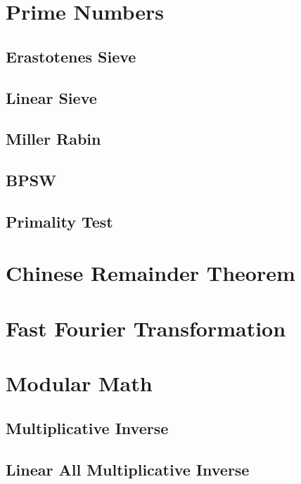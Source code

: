 \documentclass[10pt,a4paper]{report}
\begin{document}
	\section{Prime Numbers}
		\subsection{Erastotenes Sieve}
		\subsection{Linear Sieve}
			
		\subsection{Miller Rabin}
			
		\subsection{BPSW}
			
		\subsection{Primality Test}
			
		
	\section{Chinese Remainder Theorem}
	
	\newpage
	\section{Fast Fourier Transformation}
		
	
	\section{Modular Math}
		\subsection{Multiplicative Inverse}
		\subsection{Linear All Multiplicative Inverse}
	
\end{document}
